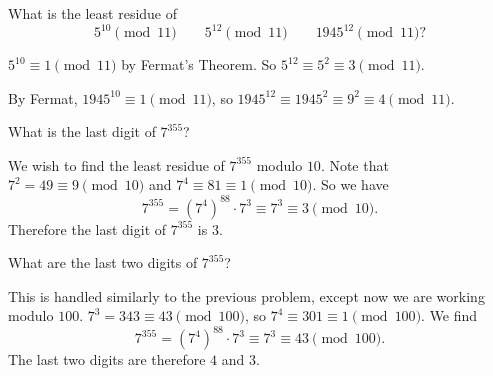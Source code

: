  What is the least residue of
\begin{equation*}
  5^{10}\pmod{11} \qquad 5^{12}\pmod{11} \qquad 1945^{12}\pmod{11}?
\end{equation*}
\begin{solution}
  $5^{10}\equiv1\pmod{11}$ by Fermat's Theorem. So
  $5^{12} \equiv 5^2 \equiv 3\pmod{11}$.

  By Fermat, $1945^{10}\equiv1\pmod{11}$, so
  $1945^{12}\equiv1945^2\equiv9^2\equiv4\pmod{11}$.
\end{solution}

 What is the last digit of $7^{355}$?
\begin{solution}
  We wish to find the least residue of $7^{355}$ modulo $10$. Note
  that $7^2 = 49 \equiv 9\pmod{10}$ and
  $7^4\equiv81\equiv1\pmod{10}$. So we have
  \begin{equation*}
    7^{355} = (7^4)^{88}\cdot7^3 \equiv 7^3 \equiv 3 \pmod {10}.
  \end{equation*}
  Therefore the last digit of $7^{355}$ is $3$.
\end{solution}

 What are the last two digits of $7^{355}$?
\begin{solution}
  This is handled similarly to the previous problem, except now we are
  working modulo $100$. $7^3 = 343 \equiv 43\pmod{100}$, so
  $7^4\equiv301\equiv1\pmod{100}$. We find
  \begin{equation*}
    7^{355} = (7^4)^{88}\cdot7^3 \equiv 7^3 \equiv 43\pmod{100}.
  \end{equation*}
  The last two digits are therefore $4$ and $3$.
\end{solution}
